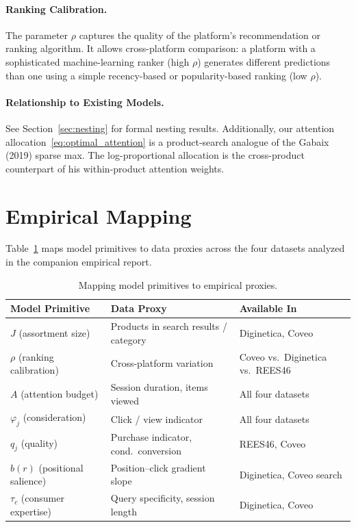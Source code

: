\documentclass[12pt]{article}
\begin{document}
\paragraph{Ranking Calibration.} The parameter $\rho$ captures the quality of the platform's recommendation or ranking algorithm. It allows cross-platform comparison: a platform with a sophisticated machine-learning ranker (high $\rho$) generates different predictions than one using a simple recency-based or popularity-based ranking (low $\rho$).

\paragraph{Relationship to Existing Models.} See Section~\ref{sec:nesting} for formal nesting results. Additionally, our attention allocation~\eqref{eq:optimal_attention} is a product-search analogue of the Gabaix (2019) sparse max. The log-proportional allocation is the cross-product counterpart of his within-product attention weights.

\section{Empirical Mapping}\label{sec:empirical_mapping}

Table~\ref{tab:mapping} maps model primitives to data proxies across the four datasets analyzed in the companion empirical report.

\begin{table}[h]
\centering
\small
\begin{tabular}{lll}
\toprule
\textbf{Model Primitive} & \textbf{Data Proxy} & \textbf{Available In} \\
\midrule
$J$ (assortment size) & Products in search results / category & Diginetica, Coveo \\
$\rho$ (ranking calibration) & Cross-platform variation & Coveo vs.\ Diginetica vs.\ REES46 \\
$A$ (attention budget) & Session duration, items viewed & All four datasets \\
$\varphi_j$ (consideration) & Click / view indicator & All four datasets \\
$q_j$ (quality) & Purchase indicator, cond.\ conversion & REES46, Coveo \\
$b(r)$ (positional salience) & Position--click gradient slope & Diginetica, Coveo search \\
$\tau_c$ (consumer expertise) & Query specificity, session length & Diginetica, Coveo \\
\bottomrule
\end{tabular}
\caption{Mapping model primitives to empirical proxies.}
\label{tab:mapping}
\end{table}
\end{document}
